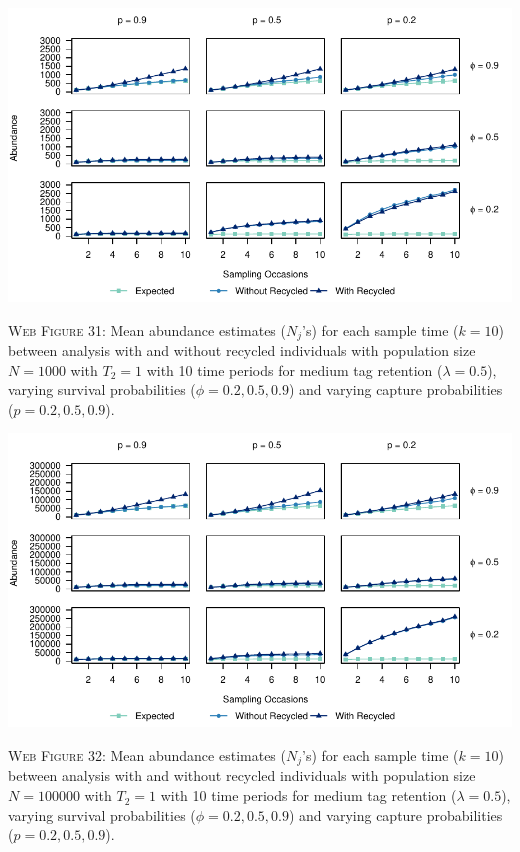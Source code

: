 \documentclass[]{article}
\begin{document}
\includegraphics{Appendix_files/figure-latex/31_abundance_M_GJSTL1-1.pdf}

\textsc{Web Figure 31:} Mean abundance estimates (\(N_j\)'s) for each
sample time (\(k=10\)) between analysis with and without recycled
individuals with population size \(N=1000\) with \(T_2=1\) with 10 time
periods for medium tag retention (\(\lambda=0.5\)), varying survival
probabilities (\(\phi=0.2,0.5,0.9\)) and varying capture probabilities
(\(p=0.2,0.5,0.9\)).

\includegraphics{Appendix_files/figure-latex/32_abundance_M_GJSTL2-1.pdf}

\textsc{Web Figure 32:} Mean abundance estimates (\(N_j\)'s) for each
sample time (\(k=10\)) between analysis with and without recycled
individuals with population size \(N=100000\) with \(T_2=1\) with 10
time periods for medium tag retention (\(\lambda=0.5\)), varying
survival probabilities (\(\phi=0.2,0.5,0.9\)) and varying capture
probabilities (\(p=0.2,0.5,0.9\)).

\newpage
\end{document}
